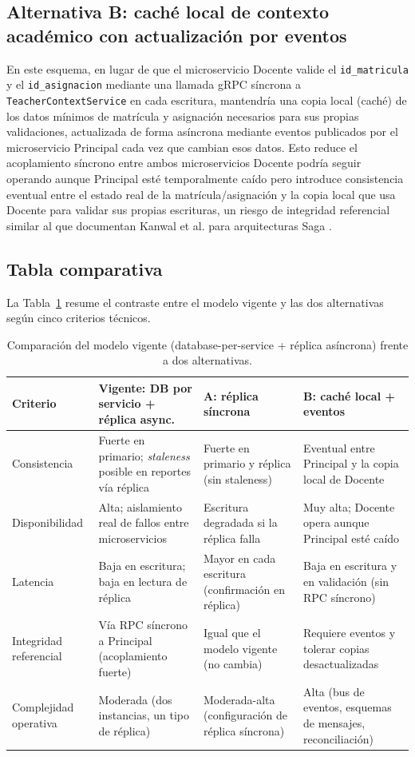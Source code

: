 \documentclass[11pt,a4paper]{article}
\begin{document}
\subsection{Alternativa B: caché local de contexto académico con actualización por eventos}

En este esquema, en lugar de que el microservicio Docente valide el \texttt{id\_matricula} y el \texttt{id\_asignacion} mediante una llamada gRPC síncrona a \texttt{TeacherContextService} en cada escritura, mantendría una copia local (caché) de los datos mínimos de matrícula y asignación necesarios para sus propias validaciones, actualizada de forma asíncrona mediante eventos publicados por el microservicio Principal cada vez que cambian esos datos. Esto reduce el acoplamiento síncrono entre ambos microservicios Docente podría seguir operando aunque Principal esté temporalmente caído pero introduce consistencia eventual entre el estado real de la matrícula/asignación y la copia local que
usa Docente para validar sus propias escrituras, un riesgo de integridad referencial similar al que documentan Kanwal et al. para arquitecturas Saga \cite{kanwal2025}.

\subsection{Tabla comparativa}

La Tabla~\ref{tab:comparacion} resume el contraste entre el modelo vigente y las dos alternativas según cinco criterios técnicos.

\begin{table}[h]
\centering
\caption{Comparación del modelo vigente (database-per-service + réplica asíncrona) frente a
dos alternativas.}
\label{tab:comparacion}
\begin{tabular}{@{}p{2.6cm}p{3.4cm}p{3.4cm}p{3.6cm}@{}}
\toprule
\textbf{Criterio} & \textbf{Vigente: DB por servicio + réplica async.} & \textbf{A: réplica síncrona} & \textbf{B: caché local + eventos} \\
\midrule
Consistencia & Fuerte en primario; \emph{staleness} posible en reportes vía réplica & Fuerte en primario y réplica (sin staleness) & Eventual entre Principal y la copia local de Docente \\
Disponibilidad & Alta; aislamiento real de fallos entre microservicios & Escritura degradada si la réplica falla & Muy alta; Docente opera aunque Principal esté caído \\
Latencia & Baja en escritura; baja en lectura de réplica & Mayor en cada escritura (confirmación en réplica) & Baja en escritura y en validación (sin RPC síncrono) \\
Integridad referencial & Vía RPC síncrono a Principal (acoplamiento fuerte) & Igual que el modelo vigente (no cambia) & Requiere eventos y tolerar copias desactualizadas \\
Complejidad operativa & Moderada (dos instancias, un tipo de réplica) & Moderada-alta (configuración de réplica síncrona) & Alta (bus de eventos, esquemas de mensajes, reconciliación) \\
\bottomrule
\end{tabular}
\end{table}
\end{document}
